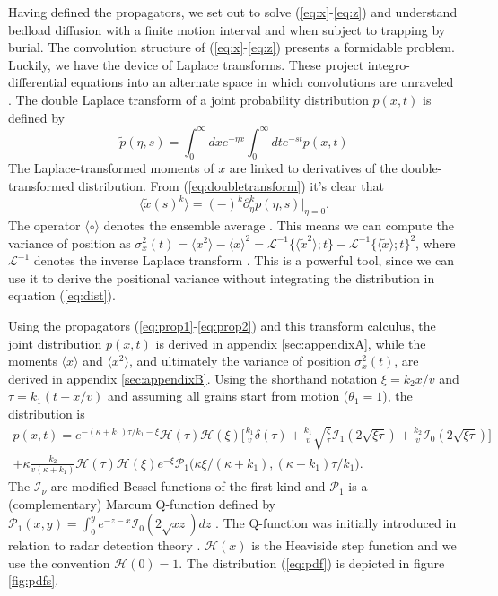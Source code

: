 \documentclass[]{agujournal2018}
\newcommand\be{\begin{equation}}
\newcommand\ee{\end{equation}}
\newcommand\bra{\langle}
\newcommand\ket{\rangle}
\newcommand\El{\mathcal{L}}
\begin{document}
Having defined the propagators, we set out to solve (\ref{eq:x}-\ref{eq:z}) and understand bedload diffusion with a finite motion interval and when subject to trapping by burial.
The convolution structure of (\ref{eq:x}-\ref{eq:z}) presents a formidable problem.
Luckily, we have the device of Laplace transforms.
These project integro-differential equations into an alternate space in which convolutions are unraveled \citep[e.g.][]{Arfken1985}.
The double Laplace transform of a joint probability distribution $p(x,t)$ is defined by 
\be \tilde{p}(\eta,s) = \int_0^\infty dx e^{-\eta x}\int_0^\infty dt e^{-st} p(x,t) \label{eq:doubletransform}\ee
The Laplace-transformed moments of $x$ are linked to derivatives of the double-transformed distribution.
From (\ref{eq:doubletransform}) it's clear that
\be \bra \tilde{x}(s)^k \ket = (-)^k\partial_\eta^k p(\eta,s)\Big|_{\eta=0}.\label{eq:momenttrick}\ee
The operator $\bra \circ \ket$ denotes the ensemble average \citep[e.g.][]{Kittel1958}.
This means we can compute the variance of position as $\sigma_x^2(t) = \bra x^2 \ket - \bra x \ket^2 = \El^{-1} \{\bra\tilde{x}^2 \ket;t\} - \El^{-1} \{\bra\tilde{x} \ket;t\}^2$, where $\El^{-1}$ denotes the inverse Laplace transform \citep[e.g.][]{Arfken1985}. This is a powerful tool, since we can use it to derive the positional variance without integrating the distribution in equation (\ref{eq:dist}).


Using the propagators (\ref{eq:prop1}-\ref{eq:prop2}) and this transform calculus, the joint distribution $p(x,t)$ is derived in appendix \ref{sec:appendixA}, while the moments $\bra x \ket$ and $\bra x^2 \ket$, and ultimately the variance of position $\sigma_x^2(t)$, are derived in appendix \ref{sec:appendixB}. Using the shorthand notation $\xi = k_2 x/v$ and $\tau = k_1(t-x/v)$ \citep[c.f.][]{Lisle1998} and assuming all grains start from motion ($\theta_1=1$), the distribution is 
\begin{multline}
p(x,t) = e^{-(\kappa + k_1)\tau/k_1-\xi}\mathcal{H}(\tau)\mathcal{H}(\xi)\Bigg[\frac{k_1}{v}\delta(\tau) + \frac{k_1}{v} \sqrt{\frac{\xi}{\tau}}\mathcal{I}_1(2\sqrt{\xi\tau}) + \frac{k_2}{v} \mathcal{I}_0(2\sqrt{\xi\tau})\Bigg]\\
+ \kappa \frac{k_2}{v(\kappa+k_1)}\mathcal{H}(\tau)\mathcal{H}(\xi)e^{-\xi}\mathcal{P}_1\big(\kappa\xi/(\kappa+k_1), (\kappa+k_1)\tau/k_1\big).
\label{eq:pdf}
\end{multline}
The $\mathcal{I}_\nu$ are modified Bessel functions of the first kind and $\mathcal{P}_1$ is a (complementary) Marcum Q-function defined by $\mathcal{P}_1(x,y) = \int_0^y e^{-z-x}\mathcal{I}_0(2\sqrt{xz})dz $ \citep{Temme1996}. The Q-function was initially introduced in relation to radar detection theory \citep{Marcum1960}. $\mathcal{H}(x)$ is the Heaviside step function and we use the convention $\mathcal{H}(0)=1$.
The distribution (\ref{eq:pdf}) is depicted in figure \ref{fig:pdfs}.
\end{document}

